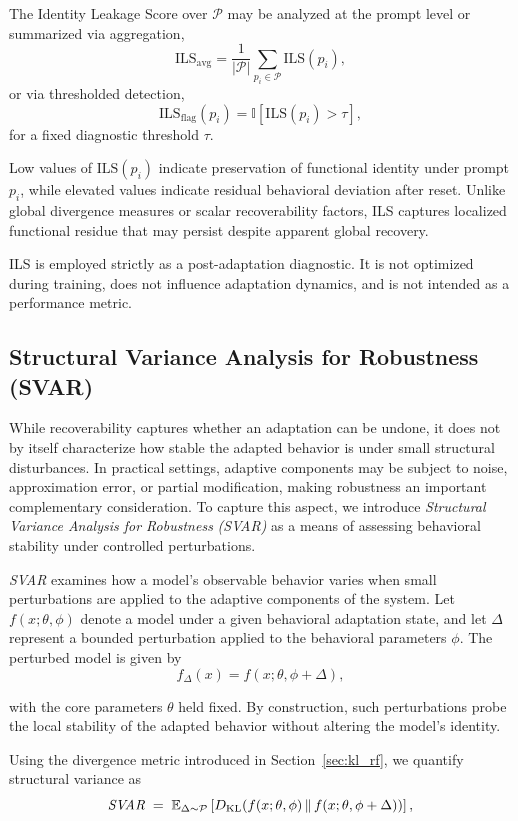 \documentclass{article}
\begin{document}
	The Identity Leakage Score over $\mathcal{P}$ may be analyzed at the prompt level or summarized via aggregation,
	\[
	\mathrm{ILS}_{\mathrm{avg}} = \frac{1}{|\mathcal{P}|} \sum_{p_i \in \mathcal{P}} \mathrm{ILS}(p_i),
	\]
	or via thresholded detection,
	\[
	\mathrm{ILS}_{\mathrm{flag}}(p_i) = \mathbb{I}\!\left[ \mathrm{ILS}(p_i) > \tau \right],
	\]
	for a fixed diagnostic threshold $\tau$.
	
	Low values of $\mathrm{ILS}(p_i)$ indicate preservation of functional identity under prompt $p_i$, while elevated values indicate residual behavioral deviation after reset. Unlike global divergence measures or scalar recoverability factors, ILS captures localized functional residue that may persist despite apparent global recovery.
	
	ILS is employed strictly as a post-adaptation diagnostic. It is not optimized during training, does not influence adaptation dynamics, and is not intended as a performance metric.
	
	\subsection{Structural Variance Analysis for Robustness (SVAR)}
	\label{sec:svar}
	
	While recoverability captures whether an adaptation can be undone, it does not by itself characterize how stable the adapted behavior is under small structural disturbances. In practical settings, adaptive components may be subject to noise, approximation error, or partial modification, making robustness an important complementary consideration. To capture this aspect, we introduce \emph{Structural Variance Analysis for Robustness} \emph{(SVAR)} as a means of assessing behavioral stability under controlled perturbations.
	
	\emph{SVAR} examines how a model’s observable behavior varies when small perturbations are applied to the adaptive components of the system. Let $f(x;\theta,\phi)$ denote a model under a given behavioral adaptation state, and let $\Delta$ represent a bounded perturbation applied to the behavioral parameters $\phi$. The perturbed model is given by
	\[
	f_\Delta(x) = f(x;\theta,\phi + \Delta),
	\]
	
	with the core parameters $\theta$ held fixed. By construction, such perturbations probe the local stability of the adapted behavior without altering the model’s identity.
	
	Using the divergence metric introduced in Section~\ref{sec:kl_rf}, we quantify structural variance as
	\[
	\mathrm{\emph{SVAR}}
	\;=\;
	\mathbb{E}_{\Delta \sim \mathcal{P}}
	\left[
	D_{\mathrm{KL}}\!\left(f(x;\theta,\phi) \,\|\, f(x;\theta,\phi + \Delta)\right)
	\right],
	\]
	
\end{document}
